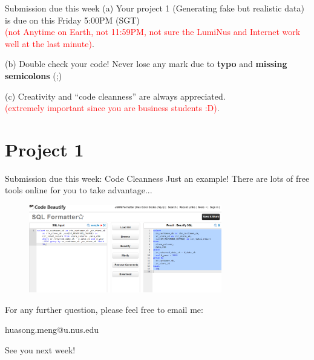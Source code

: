 \begin{frame}[fragile]{Submission due this week}
	(a) Your project 1 (Generating fake but realistic data) is due on this Friday 5:00PM (SGT)
	\\ \textcolor{red}{\scriptsize(not Anytime on Earth, not 11:59PM, not sure the LumiNus and Internet work well at the last minute)}.\vspace{10pt}
	
	(b) Double check your code! Never lose any mark due to \textbf{typo} and \textbf{missing semicolons} (;) \vspace{10pt}
	
	(c) Creativity and ``code cleanness'' are always appreciated.
	\\ \textcolor{red}{\scriptsize(extremely important since you are business students :D)}.\vspace{10pt}
\end{frame}
\section*{Project 1}

\begin{frame}[fragile]{Submission due this week: Code Cleanness}
	Just an example! There are lots of free tools online for you to take advantage... \vspace{10pt}
	\begin{figure}
		\includegraphics[width=0.75\textwidth]{t1/images/code_format.png}
	\end{figure}
\end{frame}

\begin{frame}{}
\centering  
For any further question, please feel free to email me:\vspace{10pt}

huasong.meng@u.nus.edu \vspace{20pt}

See you next week!
\end{frame}